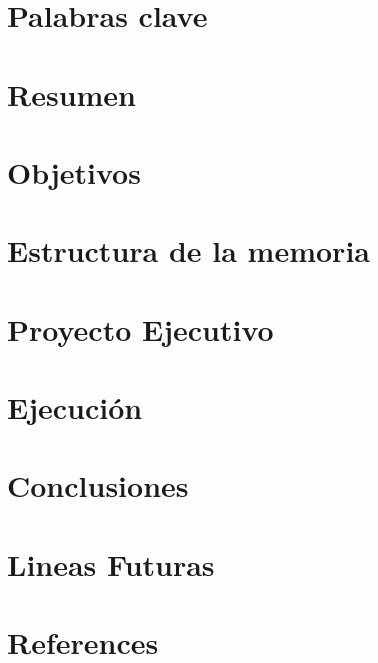 \documentclass[12pt,a4paper]{article}
\begin{document}
	
%	



	\section{Palabras clave}\label{sec:glossary}
		
	\section{Resumen}\label{sec:introduccion}
		
	\section{Objetivos}\label{sec:objetivos}
		
	\section{Estructura de la memoria}\label{sec:estructura}
		
	\section{Proyecto Ejecutivo}\label{sec:proyecto_ejecutivo}
		
	\section{Ejecución}\label{sec:ejecucion}
		
%		
	\section{Conclusiones}\label{sec:conclusiones}
		
	\section{Lineas Futuras}\label{sec:lineas_futuras}
		
\newpage
	\section{References}\label{sec:references}
\end{document}

